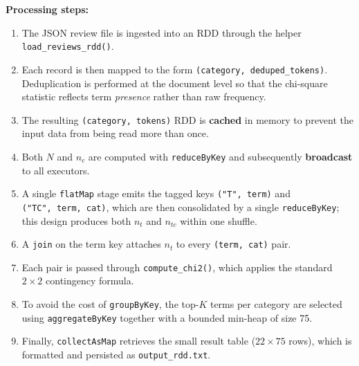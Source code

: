 \documentclass[11pt,a4paper]{extarticle}
\begin{document}
\textbf{Processing steps:}
\begin{enumerate}
  \item The JSON review file is ingested into an RDD through the helper \texttt{load\_reviews\_rdd()}.
  \item Each record is then mapped to the form \texttt{(category, deduped\_tokens)}. Deduplication is performed at the document level so that the chi-square statistic reflects term \emph{presence} rather than raw frequency.
  \item The resulting \texttt{(category, tokens)} RDD is \textbf{cached} in memory to prevent the input data from being read more than once.
  \item Both $N$ and $n_c$ are computed with \texttt{reduceByKey} and subsequently \textbf{broadcast} to all executors.
  \item A single \texttt{flatMap} stage emits the tagged keys \texttt{("T",~term)} and \texttt{("TC",~term,~cat)}, which are then consolidated by a single \texttt{reduceByKey}; this design produces both $n_t$ and $n_{tc}$ within one shuffle.
  \item A \texttt{join} on the term key attaches $n_t$ to every \texttt{(term,~cat)} pair.
  \item Each pair is passed through \texttt{compute\_chi2()}, which applies the standard $2{\times}2$ contingency formula.
  \item To avoid the cost of \texttt{groupByKey}, the top-$K$ terms per category are selected using \texttt{aggregateByKey} together with a bounded min-heap of size 75.
  \item Finally, \texttt{collectAsMap} retrieves the small result table ($22{\times}75$ rows), which is formatted and persisted as \texttt{output\_rdd.txt}.
\end{enumerate}
\vspace{0.4em}
\end{document}
